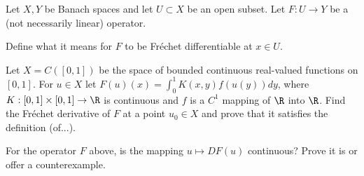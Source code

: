 Let $X,Y$ be Banach spaces and let $U\subset X$ be an open subset. Let
$F:U\rightarrow Y$ be a (not necessarily linear) operator.
\begin{alist}
\item Define what it means for $F$ to be Fr\'echet differentiable at
$x\in U$.
\item Let $X=C([0,1])$ be the space of bounded continuous real-valued
functions on $[0,1]$. For $u\in X$ let
$F(u)(x)=\int_0^1K(x,y)f(u(y))dy$, where $K:[0,1]\times
[0,1]\rightarrow \R$ is continuous and $f$ is a $C^1$ mapping of $\R$
into $\R$. Find the Fr\'echet derivative of $F$ at a point $u_0\in X$
and prove that it satisfies the definition (of...).
\item For the operator $F$ above, is the mapping $u\mapsto DF(u)$
continuous? Prove it is or offer a counterexample.
\end{alist}

